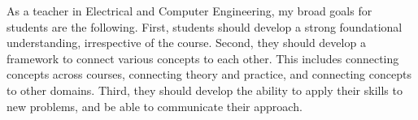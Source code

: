 \documentclass[10pt]{article}
\begin{document}
As a teacher in Electrical and Computer Engineering, my broad goals for students are the following. %
First, students should develop a strong foundational understanding, irrespective of the course. Second, they should develop a framework to connect various concepts to each other. This includes connecting concepts across courses, connecting theory and practice,  and connecting concepts to other domains. Third, they should develop the ability to apply their skills to new problems, and be able to communicate their approach. \\%
\end{document}
